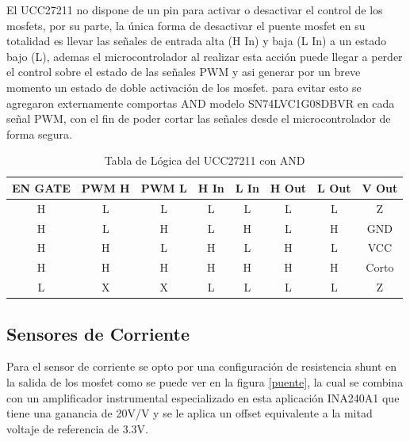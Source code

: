\documentclass[11pt]{report}
\begin{document}
El UCC27211 no dispone de un pin para activar o desactivar el control de los mosfets, por su parte, la única forma de desactivar el puente mosfet en su totalidad es llevar las señales de entrada alta (H In) y baja (L In) a un estado bajo (L), ademas el microcontrolador al realizar esta acción puede llegar a perder el control sobre el estado de las señales PWM y asi generar por un breve momento un estado de doble activación de los mosfet. para evitar esto se agregaron externamente comportas AND modelo SN74LVC1G08DBVR en cada señal PWM, con el fin de poder cortar las señales desde el microcontrolador de forma segura.

\begin{table}[ht]
	\centering
	\caption{Tabla de Lógica del UCC27211 con AND}
	\label{tab:device_logic}
	\begin{tabular}{|c|c|c|c|c|c|c|c|}
		\hline
		\textbf{EN GATE} & \textbf{PWM H} & \textbf{PWM L} & \textbf{H In} & \textbf{L In} & \textbf{H Out} & \textbf{L Out} & \textbf{V Out} \\
		\hline
		H                & L              & L              & L             & L             & L              & L              & Z              \\ \hline
		H                & L              & H              & L             & H             & L              & H              & GND            \\ \hline
		H                & H              & L              & H             & L             & H              & L              & VCC            \\ \hline
		H                & H              & H              & H             & H             & H              & H              & Corto          \\ \hline
		L                & X              & X              & L             & L             & L              & L              & Z              \\ \hline
	\end{tabular}
\end{table}
\FloatBarrier


\newpage
\subsection{Sensores de Corriente}

Para el sensor de corriente se opto por una configuración de resistencia shunt en la salida de los mosfet como se puede ver en la figura \ref{puente}, la cual se combina con un amplificador instrumental especializado en esta aplicación INA240A1 que tiene una ganancia de 20V/V y se le aplica un offset equivalente a la mitad voltaje de referencia de 3.3V.
\end{document}
